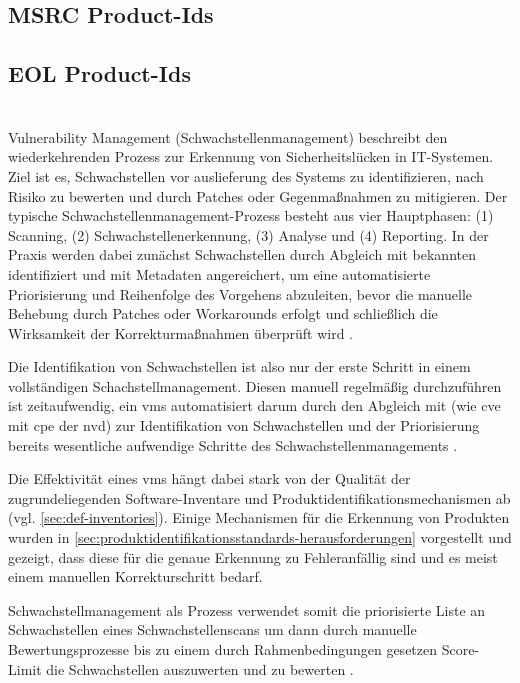 \subsection{MSRC Product-Ids}

\subsection{EOL Product-Ids}


\section{}

Vulnerability Management (Schwachstellenmanagement) beschreibt den wiederkehrenden Prozess zur Erkennung von Sicherheitslücken in IT-Systemen.
Ziel ist es, Schwachstellen vor auslieferung des Systems zu identifizieren, nach Risiko zu bewerten und durch Patches oder Gegenmaßnahmen zu mitigieren.
Der typische Schwachstellenmanagement-Prozess besteht aus vier Hauptphasen: (1) Scanning, (2) Schwachstellenerkennung, (3) Analyse und (4) Reporting.
In der Praxis werden dabei zunächst Schwachstellen durch Abgleich mit bekannten  identifiziert und mit Metadaten angereichert, um eine automatisierte Priorisierung und Reihenfolge des Vorgehens abzuleiten, bevor die manuelle Behebung durch Patches oder Workarounds erfolgt und schließlich die Wirksamkeit der Korrekturmaßnahmen überprüft wird \autocite{foreman2019vulnerabilityManagement}.

Die Identifikation von Schwachstellen ist also nur der erste Schritt in einem vollständigen Schachstellmanagement.
Diesen manuell regelmäßig durchzuführen ist zeitaufwendig, ein \acrshort{vms} automatisiert darum durch den Abgleich mit  (wie \acrshort{cve} mit \acrshort{cpe} der \acrshort{nvd}) zur Identifikation von Schwachstellen und der Priorisierung bereits wesentliche aufwendige Schritte des Schwachstellenmanagements \autocite{Idrissi_Sebai_Faroukhi_Mahouachi_2024}.

Die Effektivität eines \acrshort{vms} hängt dabei stark von der Qualität der zugrundeliegenden Software-Inventare und Produktidentifikationsmechanismen ab (vgl. \autoref{sec:def-inventories}).
Einige Mechanismen für die Erkennung von Produkten wurden in \autoref{sec:produktidentifikationsstandards-herausforderungen} vorgestellt und gezeigt, dass diese für die genaue Erkennung zu Fehleranfällig sind und es meist einem manuellen Korrekturschritt bedarf.

Schwachstellmanagement als Prozess verwendet somit die priorisierte Liste an Schwachstellen eines Schwachstellenscans um dann durch manuelle Bewertungsprozesse bis zu einem durch Rahmenbedingungen gesetzen Score-Limit die Schwachstellen auszuwerten und zu bewerten \autocite{foreman2019vulnerabilityManagement}.
